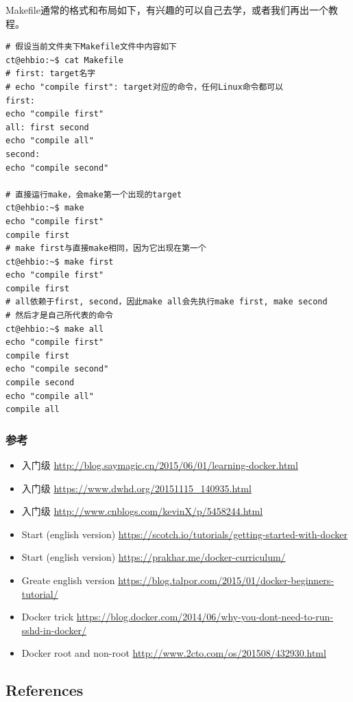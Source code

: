 \documentclass[]{article}
\numberwithin{figure}{section}
\numberwithin{table}{section}
\begin{document}
Makefile通常的格式和布局如下，有兴趣的可以自己去学，或者我们再出一个教程。

\begin{verbatim}
# 假设当前文件夹下Makefile文件中内容如下 
ct@ehbio:~$ cat Makefile
# first: target名字
# echo "compile first": target对应的命令，任何Linux命令都可以
first:
echo "compile first"
all: first second
echo "compile all"
second:
echo "compile second"

# 直接运行make，会make第一个出现的target
ct@ehbio:~$ make
echo "compile first"
compile first
# make first与直接make相同，因为它出现在第一个 
ct@ehbio:~$ make first
echo "compile first"
compile first
# all依赖于first, second，因此make all会先执行make first, make second
# 然后才是自己所代表的命令 
ct@ehbio:~$ make all
echo "compile first"
compile first
echo "compile second"
compile second
echo "compile all"
compile all
\end{verbatim}

\hypertarget{docker_ref}{%
\subsubsection{参考}\label{docker_ref}}

\begin{itemize}
\item
  入门级 \url{http://blog.saymagic.cn/2015/06/01/learning-docker.html}
\item
  入门级 \url{https://www.dwhd.org/20151115_140935.html}
\item
  入门级 \url{http://www.cnblogs.com/kevinX/p/5458244.html}
\item
  Start (english version) \url{https://scotch.io/tutorials/getting-started-with-docker}
\item
  Start (english version) \url{https://prakhar.me/docker-curriculum/}
\item
  Greate english version \url{https://blog.talpor.com/2015/01/docker-beginners-tutorial/}
\item
  Docker trick \url{https://blog.docker.com/2014/06/why-you-dont-need-to-run-sshd-in-docker/}
\item
  Docker root and non-root \url{http://www.2cto.com/os/201508/432930.html}
\end{itemize}

\hypertarget{references}{%
\subsection{References}\label{references}}
\end{document}
